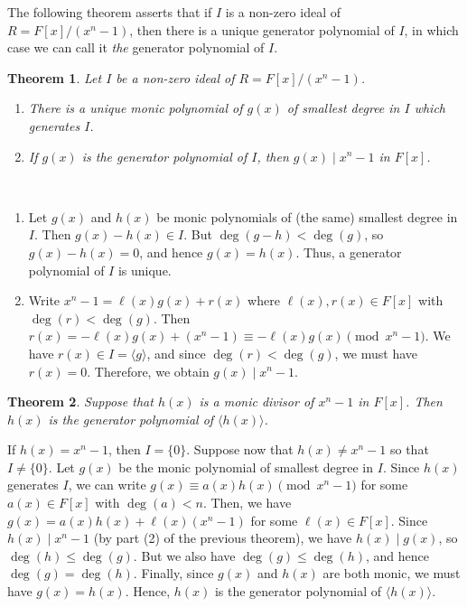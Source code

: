 \documentclass[10pt]{article}
\makeatletter
\theoremstyle{newstyle}
\newtheorem{thm}{Theorem}[subsection]
\newenvironment{pf}[1][\proofname]{\par
  \pushQED{\qed}%
  \normalfont \topsep0\p@\relax
  \trivlist
  \item[\hskip\labelsep\scshape
  #1\@addpunct{.}]\ignorespaces
}{%
  \popQED\endtrivlist\@endpefalse
}
\makeatother
\begin{document}
The following theorem asserts that if $I$ is a non-zero ideal of $R = F[x]/(x^n-1)$, then 
there is a unique generator polynomial of $I$, in which case we can call it {\it the} 
generator polynomial of $I$. 

\begin{thm}
Let $I$ be a non-zero ideal of $R = F[x]/(x^n-1)$. 
\begin{enumerate}[(1)]
    \item There is a unique monic polynomial of $g(x)$ of smallest degree in $I$ which generates $I$.
    \item If $g(x)$ is the generator polynomial of $I$, then $g(x) \mid x^n - 1$ in $F[x]$. 
\end{enumerate}
\end{thm}
\begin{pf}~
\begin{enumerate}[(1)]
    \item Let $g(x)$ and $h(x)$ be monic polynomials of (the same) smallest degree in $I$. 
    Then $g(x) - h(x) \in I$. But $\deg(g-h) < \deg(g)$, so $g(x) - h(x) = 0$, and hence 
    $g(x) = h(x)$. Thus, a generator polynomial of $I$ is unique.
    \item Write $x^n - 1 = \ell(x)g(x) + r(x)$ where $\ell(x), r(x) \in F[x]$ with 
    $\deg(r) < \deg(g)$. Then $r(x) = -\ell(x)g(x) + (x^n-1) \equiv -\ell(x)g(x) 
    \pmod{x^n-1}$. We have $r(x) \in I = \langle g \rangle$, and since 
    $\deg(r) < \deg(g)$, we must have $r(x) = 0$. Therefore, we obtain $g(x) \mid x^n - 1$. \qedhere 
\end{enumerate}
\end{pf}

\begin{thm}
Suppose that $h(x)$ is a monic divisor of $x^n - 1$ in $F[x]$. Then $h(x)$ is the generator polynomial of 
$\langle h(x) \rangle$. 
\end{thm}
\begin{pf}
If $h(x) = x^n - 1$, then $I = \{0\}$. Suppose now that $h(x) \neq x^n - 1$ so that $I 
\neq \{0\}$. Let $g(x)$ be the monic polynomial of smallest degree in $I$. Since $h(x)$ generates 
$I$, we can write $g(x) \equiv a(x)h(x) \pmod{x^n-1}$ for some $a(x) \in F[x]$ with 
$\deg(a) < n$. Then, we have $g(x) = a(x)h(x) + \ell(x)(x^n-1)$ for some 
$\ell(x) \in F[x]$. Since $h(x) \mid x^n - 1$ (by part (2) of the previous theorem), 
we have $h(x) \mid g(x)$, so $\deg(h) \leq \deg(g)$. But we also have $\deg(g) \leq \deg(h)$, 
and hence $\deg(g) = \deg(h)$. Finally, since $g(x)$ and $h(x)$ are both monic, we must have 
$g(x) = h(x)$. Hence, $h(x)$ is the generator polynomial of $\langle h(x) \rangle$. 
\end{pf}
\end{document}
